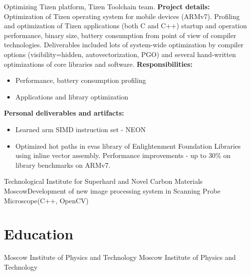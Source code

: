 \documentclass[11pt,a4paper]{moderncv}
\begin{document}
        {Optimizing Tizen platform, Tizen Toolchain team.\newline{}
\textbf{Project details:}\newline{}
Optimization of Tizen operating system for mobile devices (ARMv7). Profiling and optimization of Tizen applications (both C and C++) startup and operation performance,
binary size, battery consumption from point of view of compiler technologies. Deliverables included lots of system-wide optimization by compiler options (visibility=hidden, autovectorization, PGO)
and several hand-written optimizations of core libraries and software.\newline{}
\textbf{Responsibilities:}
\begin{itemize}
\item Performance, battery consumption profiling
\item Applications and library optimization
\end{itemize}
\textbf{Personal deliverables and artifacts:}
\begin{itemize}
\item Learned arm SIMD instruction set - NEON
\item Optimized hot paths in evas library of Enlightenment Foundation Libraries using inline vector assembly. Performance improvements - up to 30\% on library benchmarks on ARMv7.
\end{itemize}}

        {Technological Institute for Superhard and Novel Carbon Materials}
        {Moscow}{}{Development of new image processing system in
                   Scanning Probe Microscope(C++, OpenCV)}


\section{Education}
\label{sec:edu}
        {Moscow Institute of Physics and Technology}{}{}{}
        {Moscow Institute of Physics and Technology}{}{}{}
\end{document}
